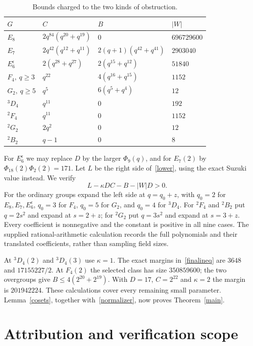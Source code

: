 \documentclass[10pt,a4paper]{article}
\begin{document}
\begin{table}[ht]\centering\small
\begin{tabular}{llll}
\toprule
$G$&$C$&$B$&$|W|$\\\midrule
$E_8$&$2q^{84}(q^{20}+q^{19})$&$0$&$696729600$\\
$E_7$&$2q^{42}(q^{12}+q^{11})$&$2(q+1)(q^{42}+q^{41})$&$2903040$\\
$E_6^\epsilon$&$2(q^{28}+q^{27})$&$2(q^{15}+q^{12})$&$51840$\\
$F_4,\ q\ge3$&$q^{22}$&$4(q^{16}+q^{15})$&$1152$\\
$G_2,\ q\ge5$&$q^5$&$6(q^5+q^4)$&$12$\\
$ {}^3D_4$&$q^{11}$&$0$&$192$\\
$ {}^2F_4$&$q^{11}$&$0$&$1152$\\
$ {}^2G_2$&$2q^2$&$0$&$12$\\
$ {}^2B_2$&$q-1$&$0$&$8$\\\bottomrule
\end{tabular}
\caption{Bounds charged to the two kinds of obstruction.}
\label{bounds}
\end{table}

For $E_6^\epsilon$ we may replace $D$ by the larger $\Phi_9(q)$,
and for $E_7(2)$ by $\Phi_{18}(2)\Phi_2(2)=171$.
Let $L$ be the right side of~\eqref{lower}, using the exact Suzuki value
instead. We verify
\begin{equation}\label{finalineq}
 L-\kappa DC-B-|W|D>0.
\end{equation}
For the ordinary groups expand the left side at $q=q_0+z$, with
$q_0=2$ for $E_8,E_7,E_6^\epsilon$, $q_0=3$ for $F_4$, $q_0=5$ for
$G_2$, and $q_0=4$ for ${}^3D_4$.
For ${}^2F_4$ and ${}^2B_2$ put $q=2s^2$ and expand at $s=2+z$;
for ${}^2G_2$ put $q=3s^2$ and expand at $s=3+z$.
Every coefficient is nonnegative and the constant is positive in all
nine cases. The supplied rational-arithmetic calculation records the
full polynomials and their translated coefficients, rather than sampling
field sizes.

At ${}^3D_4(2)$ and ${}^3D_4(3)$ use $\kappa=1$.
The exact margins in~\eqref{finalineq} are $3648$ and $17155227/2$.
At $F_4(2)$ the selected class has size $350859600$; the two overgroups
give $B\le4(2^{20}+2^{19})$. With $D=17$, $C=2^{22}$ and $\kappa=2$
the margin is $201942224$.
These calculations cover every remaining small parameter.
Lemma~\ref{cosets}, together with~\eqref{normalizer}, now proves
Theorem~\ref{main}.

\section{Attribution and verification scope}
\end{document}
